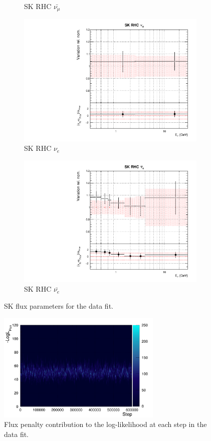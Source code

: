 \begin{figure}
\begin{subfigure}{0.45\textwidth}
  \caption{SK RHC $\bar{\nu_{\mu}}$}
\end{subfigure}
\begin{subfigure}{0.45\textwidth}
  \centering
  \includegraphics[width=0.75\linewidth]{figs/datflux14}
  \caption{SK RHC $\nu_{e}$}
\end{subfigure}
\begin{subfigure}{0.45\textwidth}
  \centering
  \includegraphics[width=0.75\linewidth]{figs/datflux15}
  \caption{SK RHC $\bar{\nu_e}$}
\end{subfigure}
\caption{SK flux parameters for the data fit.}
\label{fig:datfluxSK}
\end{figure}

\begin{figure}
\centering
\includegraphics*[width=0.7\textwidth,clip]{figs/llh_fluxdat}
\caption{Flux penalty contribution to the log-likelihood at each step in the data fit.}\label{fig:llh_fluxdat}
\end{figure}

